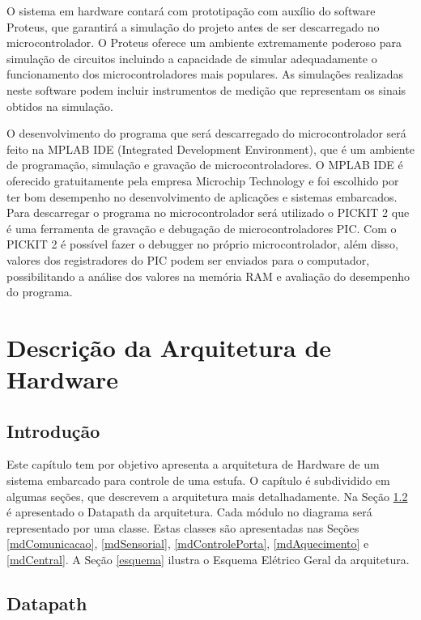 \documentclass{report}
\begin{document}
    O sistema em hardware contará com prototipação com auxílio do software Proteus, que garantirá a simulação do projeto antes de ser descarregado 
    no microcontrolador. O Proteus oferece um ambiente extremamente poderoso para simulação de circuitos incluindo a capacidade de simular adequadamente
    o funcionamento dos microcontroladores mais populares. As simulações realizadas neste software podem incluir instrumentos de medição que representam
    os sinais obtidos na simulação.


    O desenvolvimento do programa que será descarregado do microcontrolador será feito na MPLAB IDE (Integrated Development Environment), que é um ambiente
    de programação, simulação e gravação de microcontroladores. O MPLAB IDE é oferecido gratuitamente pela empresa Microchip Technology e foi escolhido por
    ter bom desempenho no desenvolvimento de aplicações e sistemas embarcados. Para descarregar o programa no microcontrolador será utilizado o PICKIT 2 que
    é uma ferramenta de gravação e debugação de microcontroladores PIC. Com o PICKIT 2 é possível fazer o debugger no próprio microcontrolador, além disso, 
    valores dos registradores do PIC podem ser enviados para o computador, possibilitando a análise dos valores na memória RAM e avaliação do desempenho do 
    programa.

\chapter{Descrição da Arquitetura de Hardware}

    \section{Introdução}
	Este capítulo tem por objetivo apresenta a arquitetura de Hardware de um sistema embarcado para controle de uma estufa. O 
	capítulo é subdividido em algumas seções, que descrevem a arquitetura mais detalhadamente. Na Seção {\ref{datapath}} é apresentado o 
	Datapath da arquitetura. Cada módulo no diagrama será representado por uma classe. Estas classes são apresentadas 
	nas Seções {\ref{mdComunicacao}}, {\ref{mdSensorial}}, {\ref{mdControlePorta}}, {\ref{mdAquecimento}} e {\ref{mdCentral}}.
	A Seção {\ref{esquema}}	ilustra o Esquema Elétrico Geral da arquitetura. 
      
      
    \section{Datapath}\label{datapath}
	
\end{document}

